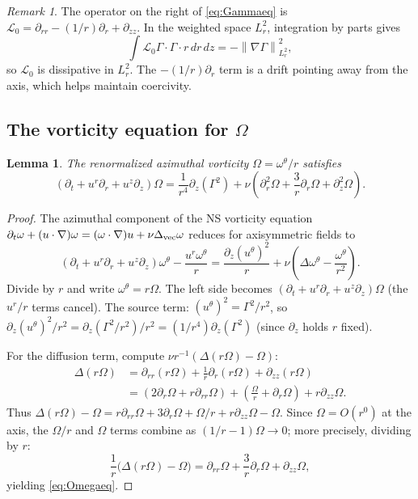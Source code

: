 \documentclass{article}
\newtheorem{lemma}[theorem]{Lemma}
\theoremstyle{definition}
\theoremstyle{remark}
\newtheorem{remark}[theorem]{Remark}
\newcommand{\Lc}{\mathcal{L}}
\newcommand{\norm}[1]{\left\|#1\right\|}
\begin{document}
\begin{remark}
  The operator on the right of \eqref{eq:Gammaeq} is
  $\Lc_0 = \partial_{rr} - (1/r)\partial_r + \partial_{zz}$.
  In the weighted space $L^2_r$, integration by parts gives
  \[
    \int\Lc_0\Gamma\cdot\Gamma\cdot r\,dr\,dz
    = -\norm{\nabla\Gamma}_{L^2_r}^2,
  \]
  so $\Lc_0$ is dissipative in $L^2_r$.  The $-(1/r)\partial_r$ term is a
  drift pointing away from the axis, which helps maintain coercivity.
\end{remark}

\subsection{The vorticity equation for \texorpdfstring{$\Omega$}{Omega}}

\begin{lemma}\label{lem:Omegaeq}
  The renormalized azimuthal vorticity $\Omega = \omega^\theta/r$ satisfies
  \begin{equation}\label{eq:Omegaeq}
    (\partial_t + u^r\partial_r + u^z\partial_z)\Omega
    = \frac{1}{r^4}\partial_z(\Gamma^2)
    + \nu\!\left(\partial_r^2\Omega + \frac{3}{r}\partial_r\Omega
      + \partial_z^2\Omega\right).
  \end{equation}
\end{lemma}
\begin{proof}
  The azimuthal component of the NS vorticity equation
  $\partial_t\omega + (u\cdot\nabla)\omega = (\omega\cdot\nabla)u
  + \nu\Delta_{\rm vec}\omega$ reduces for axisymmetric fields to
  \[
    (\partial_t + u^r\partial_r + u^z\partial_z)\omega^\theta
    - \frac{u^r\omega^\theta}{r}
    = \frac{\partial_z(u^\theta)^2}{r}
    + \nu\!\left(\Delta\omega^\theta - \frac{\omega^\theta}{r^2}\right).
  \]
  Divide by $r$ and write $\omega^\theta = r\Omega$.  The left side becomes
  $(\partial_t + u^r\partial_r + u^z\partial_z)\Omega$ (the $u^r/r$ terms
  cancel).  The source term: $(u^\theta)^2 = \Gamma^2/r^2$, so
  $\partial_z(u^\theta)^2/r^2 = \partial_z(\Gamma^2/r^2)/r^2
  = (1/r^4)\partial_z(\Gamma^2)$ (since $\partial_z$ holds $r$ fixed).
  
  For the diffusion term, compute $\nu r^{-1}(\Delta(r\Omega) - \Omega)$:
  \begin{align*}
    \Delta(r\Omega) &= \partial_{rr}(r\Omega) + \tfrac{1}{r}\partial_r(r\Omega)
      + \partial_{zz}(r\Omega)\\
    &= (2\partial_r\Omega + r\partial_{rr}\Omega)
      + (\tfrac{\Omega}{r} + \partial_r\Omega)
      + r\partial_{zz}\Omega.
  \end{align*}
  Thus $\Delta(r\Omega) - \Omega = r\partial_{rr}\Omega + 3\partial_r\Omega
  + \Omega/r + r\partial_{zz}\Omega - \Omega$.  Since $\Omega = O(r^0)$ at
  the axis, the $\Omega/r$ and $\Omega$ terms combine as
  $(1/r - 1)\Omega \to 0$; more precisely, dividing by $r$:
  \[
    \frac{1}{r}\bigl(\Delta(r\Omega)-\Omega\bigr)
    = \partial_{rr}\Omega + \frac{3}{r}\partial_r\Omega
      + \partial_{zz}\Omega,
  \]
  yielding \eqref{eq:Omegaeq}.
\end{proof}
\end{document}
